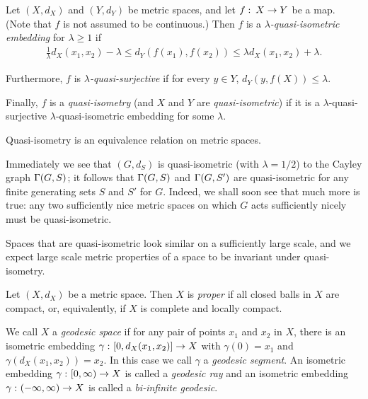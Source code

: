 \begin{definition}
  Let $(X,d_X)$ and $(Y,d_Y)$ be metric spaces, and let $f \operatorname{\colon} X \to Y$ be a map.
  (Note that $f$ is not assumed to be continuous.)
  Then $f$ is a \emph{$\lambda$-quasi-isometric embedding} for $\lambda \geq 1$ if
  \begin{align}
    \frac{1}{\lambda} d_X(x_1, x_2) - \lambda \leq d_Y(f(x_1), f(x_2)) \leq \lambda d_X(x_1, x_2) + \lambda.
  \end{align}
  
  Furthermore, $f$ is \emph{$\lambda$-quasi-surjective} if for every $y \in Y$, $d_Y(y, f(X)) \leq \lambda$.

  Finally, $f$ is a \emph{quasi-isometry} (and $X$ and $Y$ are \emph{quasi-isometric}) if it is a $\lambda$-quasi-surjective $\lambda$-quasi-isometric embedding for some $\lambda$.
\end{definition}

\begin{lemma}
  Quasi-isometry is an equivalence relation on metric spaces.
\end{lemma}

Immediately we see that $(G,d_S)$ is quasi-isometric (with $\lambda = 1/2$) to the Cayley graph $\operatorname{\Gamma}(G,S)$; it follows that $\operatorname{\Gamma}(G,S)$ and $\operatorname{\Gamma}(G,S')$ are quasi-isometric for any finite generating sets $S$ and $S'$ for $G$.
Indeed, we shall soon see that much more is true: any two sufficiently nice metric spaces on which $G$ acts sufficiently nicely must be quasi-isometric.

Spaces that are quasi-isometric look similar on a sufficiently large scale, and we expect large scale metric properties of a space to be invariant under quasi-isometry.

\begin{definition}
  Let $(X,d_X)$ be a metric space.
  Then $X$ is \emph{proper} if all closed balls in $X$ are compact, or, equivalently, if $X$ is complete and locally compact.

  We call $X$ a \emph{geodesic space} if for any pair of points $x_1$ and $x_2$ in $X$, there is an isometric embedding $\gamma \operatorname{\colon} [0, d_X(x_1, x_2)] \to X$ with $\gamma(0) = x_1$ and $\gamma(d_X(x_1, x_2)) = x_2$.
  In this case we call $\gamma$ a \emph{geodesic segment}. 
  An isometric embedding $\gamma \operatorname{\colon} [0, \infty) \to X$ is called a \emph{geodesic ray} and an isometric embedding $\gamma \operatorname{\colon} (-\infty, \infty) \to X$ is called a \emph{bi-infinite geodesic}.
\end{definition}

